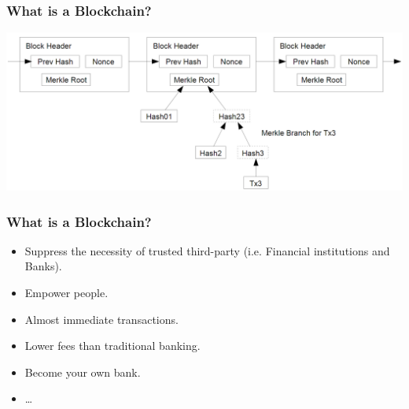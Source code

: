\documentclass[notitlepage, usenames,dvipsnames]{beamer}
\begin{document}
    \begin{frame}
        \frametitle{What is a Blockchain?}

        \begin{overlayarea}{\textwidth}{\textheight}

            \vspace{4ex}

             {
            }

             {
            \vspace{4ex}
            \includegraphics[scale=0.26]{../img/block-chain.png}
            }

        \end{overlayarea}
    \end{frame}


    \begin{frame}
        \frametitle{What is a Blockchain?}

        \begin{overlayarea}{\textwidth}{\textheight}

            \vspace{4ex}

             {
            }

             {
            \vspace{4ex}
            \begin{itemize}
                \item \alert{Suppress} the necessity of trusted third-party (i.e. Financial institutions and Banks).
                \item \alert{Empower} people.
                \item Almost \alert{immediate} transactions.
                \item Lower fees than traditional banking.
                \item Become your own bank.
                \item \ldots
            \end{itemize}

            }

        \end{overlayarea}
    \end{frame}
\end{document}
